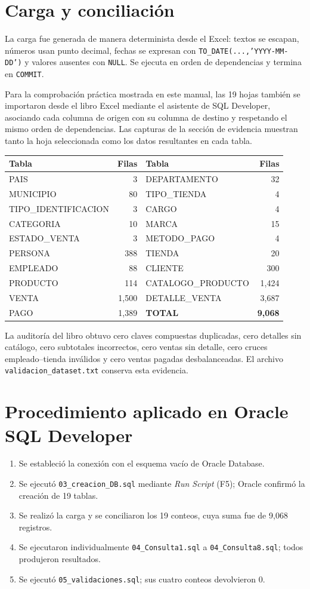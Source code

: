 \documentclass[10pt,letterpaper]{article}
\begin{document}
\section{Carga y conciliación}
La carga fue generada de manera determinista desde el Excel: textos se escapan, números usan punto decimal, fechas se expresan con \texttt{TO\_DATE(...,'YYYY-MM-DD')} y valores ausentes con \texttt{NULL}. Se ejecuta en orden de dependencias y termina en \texttt{COMMIT}.

Para la comprobación práctica mostrada en este manual, las 19 hojas también se importaron desde el libro Excel mediante el asistente de SQL Developer, asociando cada columna de origen con su columna de destino y respetando el mismo orden de dependencias. Las capturas de la sección de evidencia muestran tanto la hoja seleccionada como los datos resultantes en cada tabla.

\begin{longtable}{lr@{\qquad}lr}\toprule
Tabla&Filas&Tabla&Filas\\\midrule\endhead
PAIS&3&DEPARTAMENTO&32\\MUNICIPIO&80&TIPO\_TIENDA&4\\TIPO\_IDENTIFICACION&3&CARGO&4\\CATEGORIA&10&MARCA&15\\ESTADO\_VENTA&3&METODO\_PAGO&4\\PERSONA&388&TIENDA&20\\EMPLEADO&88&CLIENTE&300\\PRODUCTO&114&CATALOGO\_PRODUCTO&1,424\\VENTA&1,500&DETALLE\_VENTA&3,687\\PAGO&1,389&\textbf{TOTAL}&\textbf{9,068}\\\bottomrule\end{longtable}

La auditoría del libro obtuvo cero claves compuestas duplicadas, cero detalles sin catálogo, cero subtotales incorrectos, cero ventas sin detalle, cero cruces empleado--tienda inválidos y cero ventas pagadas desbalanceadas. El archivo \texttt{validacion\_dataset.txt} conserva esta evidencia.

\section{Procedimiento aplicado en Oracle SQL Developer}
\begin{enumerate}
\item Se estableció la conexión con el esquema vacío de Oracle Database.
\item Se ejecutó \texttt{03\_creacion\_DB.sql} mediante \emph{Run Script} (F5); Oracle confirmó la creación de 19 tablas.
\item Se realizó la carga y se conciliaron los 19 conteos, cuya suma fue de 9,068 registros.
\item Se ejecutaron individualmente \texttt{04\_Consulta1.sql} a \texttt{04\_Consulta8.sql}; todos produjeron resultados.
\item Se ejecutó \texttt{05\_validaciones.sql}; sus cuatro conteos devolvieron 0.
\end{enumerate}
\end{document}
